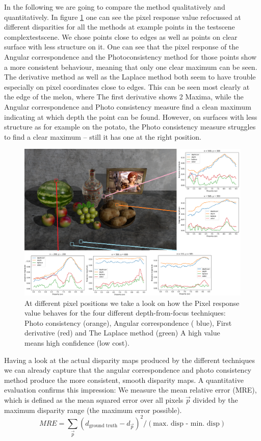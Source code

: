 \documentclass  [
  paper    = a4,
  BCOR     = 10mm,
  twoside,
  fontsize = 12pt,
  fleqn,
  toc      = bibnumbered,
  toc      = listofnumbered,
  numbers  = noendperiod,
  headings = normal,
  listof   = leveldown,
  version  = 3.03
]                                       {scrreprt}
\begin{document}
\begin{description}
	In the following we are going to compare the method qualitatively and quantitatively. In figure \ref{fig:originalmarked} one can see the pixel response value refocussed at different disparities for all the methods at example points in the testscene \glqq complextestscene\grqq. We chose points close to edges as well as points on clear surface with less structure on it. One can see that the pixel response of the Angular correspondence and the Photoconsistency method for those points show a more consistent behaviour, meaning that only one clear maximum can be seen. The derivative method as well as the Laplace method both seem to have trouble especially on pixel coordinates close to edges. This can be seen most clearly at the edge of the melon, where The first derivative shows 2 Maxima, while the Angular correspondence and Photo consistency measure find a clean maximum indicating at which depth the point can be found. However, on surfaces with less structure as for example on the potato, the Photo consistency measure struggles to find a clear maximum -- still it has one at the right position. 
	\begin{figure}
		\centering
		\includegraphics[width=1\linewidth]{images/original_marked}
		\caption[Pixel response for depth from focus techniques]{At different pixel positions we take a look on how the Pixel response value behaves for the four different depth-from-focus techniques: Photo consistency (orange), Angular correspondence ( blue), First derivative (red) and The Laplace method (green) A high value means high confidence (low cost).}
		\label{fig:originalmarked}
	\end{figure}
	Having a look at the actual disparity maps produced by the different techniques we can already
	capture that the angular correspondence and photo consistency method produce the more consistent, smooth disparity maps. A quantitative evaluation confirms this impression: We measure the mean relative error (MRE), which is defined as the mean squared error over all pixels $\vec{p}$ divided by the maximum disparity range (the maximum error possible).
	\begin{equation}\label{key}
	MRE = \sum_{\vec p } (d_{\text{ground truth}} - d_{\vec p} )^2/(\text{max. disp - min. disp})
	\end{equation}
	

\end{description}
\end{document}
